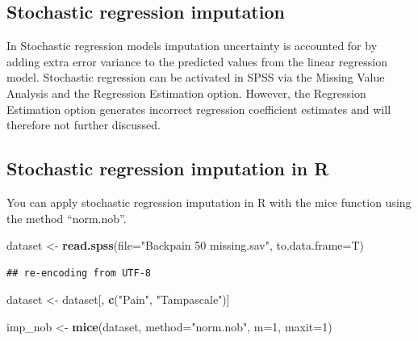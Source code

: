 \documentclass[
]{book}
\newenvironment{Shaded}{\begin{snugshade}}{\end{snugshade}}
\newcommand{\DataTypeTok}[1]{\textcolor[rgb]{0.13,0.29,0.53}{#1}}
\newcommand{\DecValTok}[1]{\textcolor[rgb]{0.00,0.00,0.81}{#1}}
\newcommand{\KeywordTok}[1]{\textcolor[rgb]{0.13,0.29,0.53}{\textbf{#1}}}
\newcommand{\NormalTok}[1]{#1}
\newcommand{\StringTok}[1]{\textcolor[rgb]{0.31,0.60,0.02}{#1}}
\begin{document}
\hypertarget{stochastic-regression-imputation}{%
\subsection{Stochastic regression imputation}\label{stochastic-regression-imputation}}

In Stochastic regression models imputation uncertainty is accounted for by adding extra error variance to the predicted values from the linear regression model. Stochastic regression can be activated in SPSS via the Missing Value Analysis and the Regression Estimation option. However, the Regression Estimation option generates incorrect regression coefficient estimates \citep{hippel2004} and will therefore not further discussed.

\hypertarget{stochastic-regression-imputation-in-r}{%
\subsection{Stochastic regression imputation in R}\label{stochastic-regression-imputation-in-r}}

You can apply stochastic regression imputation in R with the mice function using the method ``norm.nob''.

\begin{Shaded}
\begin{Highlighting}[]
\NormalTok{dataset <-}\StringTok{ }\KeywordTok{read.spss}\NormalTok{(}\DataTypeTok{file=}\StringTok{"Backpain 50 missing.sav"}\NormalTok{, }\DataTypeTok{to.data.frame=}\NormalTok{T)}
\end{Highlighting}
\end{Shaded}

\begin{verbatim}
## re-encoding from UTF-8
\end{verbatim}

\begin{Shaded}
\begin{Highlighting}[]
\NormalTok{dataset <-}\StringTok{ }\NormalTok{dataset[, }\KeywordTok{c}\NormalTok{(}\StringTok{"Pain"}\NormalTok{, }\StringTok{"Tampascale"}\NormalTok{)]}

\NormalTok{imp_nob <-}\StringTok{ }\KeywordTok{mice}\NormalTok{(dataset, }\DataTypeTok{method=}\StringTok{"norm.nob"}\NormalTok{, }\DataTypeTok{m=}\DecValTok{1}\NormalTok{, }\DataTypeTok{maxit=}\DecValTok{1}\NormalTok{)}
\end{Highlighting}
\end{Shaded}
\end{document}
